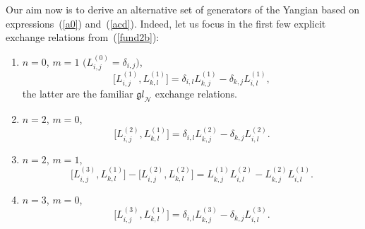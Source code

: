 \documentclass[pdftex]{sigma}
\numberwithin{equation}{section}
\theoremstyle{definition}
\begin{document}
Our aim now is to derive an alternative set of generators of the Yangian
based on expressions~(\ref{a0}) and~(\ref{acd}).
Indeed, let us focus in the first few explicit exchange relations from~(\ref{fund2b}):
\begin{enumerate}\itemsep=0pt
\item $n=0$, $m=1$ $\bigl(L_{i,j}^{(0)} = \delta_{i,j}\bigr)$,
\begin{equation*}
\bigl[ L_{i,j}^{(1)}, L_{k,l}^{(1)}\bigr] = \delta_{i,l} L_{k,j}^{(1)} -\delta_{k,j} L_{i,l}^{(1)},
\end{equation*}
the latter are the familiar ${\mathfrak gl}_{\mathcal N}$ exchange relations.
\item $n=2$, $m=0$,
\begin{equation*}
\bigl[L_{i,j}^{(2)}, L_{k,l}^{(1)}\bigr] =\delta_{i,l} L_{k,j}^{(2)} - \delta_{k,j} L_{i,l}^{(2)}.
\end{equation*}

\item $n=2$, $m=1$,
\begin{equation*}
\bigl[ L_{i,j}^{(3)}, L_{k,l}^{(1)}\bigr] -\bigl[ L_{i,j}^{(2)}, L_{k,l}^{(2)}\bigr] =
L_{k,j}^{(1)} L_{i,l}^{(2)} - L_{k,j}^{(2)} L_{i,l}^{(1)}.
\end{equation*}

\item $n=3$, $m=0$,
\begin{equation*}
\bigl[L_{i,j}^{(3)}, L_{k,l}^{(1)}\bigr] =\delta_{i,l} L_{k,j}^{(3)} - \delta_{k,j} L_{i,l}^{(3)}.
\end{equation*}
\end{enumerate}
\end{document}
